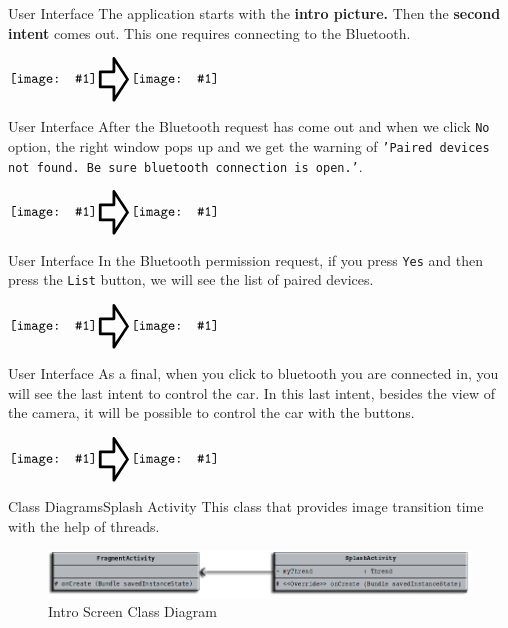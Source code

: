 \documentclass[xcolor=table, 9pt]{beamer}
\newcommand*{\vimage}[1]{\vcenter{\hbox{\texttt{[image: \#1]}}}}
\newcommand*{\vpointer}{\vcenter{\hbox{\scalebox{2}{\Huge\pointer}}}}
\begin{document}
\begin{frame}{User Interface}
The application starts with the \textbf{intro picture.} Then the \textbf{second intent} comes out. This one requires connecting to the Bluetooth.
\vspace{0.2cm}
\begin{center}
$\vimage{intro.png}\vpointer
\vimage{blue_opt.png}$
\end{center}
\end{frame}

\begin{frame}{User Interface}
After the Bluetooth request has come out and when we click \texttt{No} option, the right window pops up and we get the warning of \texttt{'Paired devices not found. Be sure bluetooth connection is open.'}.
\vspace{0.2cm}
\begin{center}
$\vimage{blue_opt.png}\vpointer
\vimage{2.png}$
\end{center}
\end{frame}

\begin{frame}{User Interface}
In the Bluetooth permission request, if you press \texttt{Yes} and then press the \texttt{List} button, we will see the list of paired devices.
\vspace{0.2cm}
\begin{center}
$\vimage{blue_opt.png}\vpointer
\vimage{blue_yes.png}$
\end{center}
\end{frame}

\begin{frame}{User Interface}
As a final, when you click to bluetooth you are connected in, you will see the last intent to control the car. In this last intent, besides the view of the camera, it will be possible to control the car with the buttons.\\
\vspace{0.2cm}
\begin{center}
$\vimage{blue_yes.png}\vpointer
\vimage{main_screen.png}$
\end{center}
\end{frame}



\begin{frame}{Class Diagrams}{Splash Activity}
This class that provides image transition time with the help of threads.
\begin{figure}
\includegraphics[width=1\linewidth]{Splash_class_diagram2.png}
\caption{Intro Screen Class Diagram}
\end{figure}
\end{frame}
\end{document}
